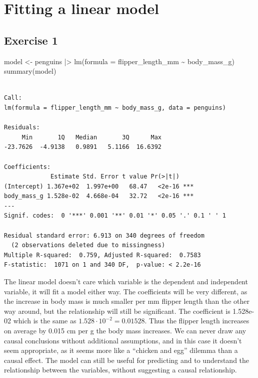 \documentclass[
  letterpaper,
  DIV=11,
  numbers=noendperiod]{scrreprt}
\newenvironment{Shaded}{\begin{snugshade}}{\end{snugshade}}
\newcommand{\AttributeTok}[1]{\textcolor[rgb]{0.40,0.45,0.13}{#1}}
\newcommand{\FunctionTok}[1]{\textcolor[rgb]{0.28,0.35,0.67}{#1}}
\newcommand{\NormalTok}[1]{\textcolor[rgb]{0.00,0.23,0.31}{#1}}
\newcommand{\OtherTok}[1]{\textcolor[rgb]{0.00,0.23,0.31}{#1}}
\newcommand{\SpecialCharTok}[1]{\textcolor[rgb]{0.37,0.37,0.37}{#1}}
\begin{document}
\section{Fitting a linear model}\label{fitting-a-linear-model-1}

\subsection{Exercise 1}\label{exercise-1-23}

\begin{Shaded}
\begin{Highlighting}[]
\NormalTok{model }\OtherTok{\textless{}{-}}\NormalTok{ penguins }\SpecialCharTok{|\textgreater{}} 
  \FunctionTok{lm}\NormalTok{(}\AttributeTok{formula =}\NormalTok{ flipper\_length\_mm }\SpecialCharTok{\textasciitilde{}}\NormalTok{ body\_mass\_g)}
\FunctionTok{summary}\NormalTok{(model)}
\end{Highlighting}
\end{Shaded}

\begin{verbatim}

Call:
lm(formula = flipper_length_mm ~ body_mass_g, data = penguins)

Residuals:
     Min       1Q   Median       3Q      Max 
-23.7626  -4.9138   0.9891   5.1166  16.6392 

Coefficients:
             Estimate Std. Error t value Pr(>|t|)    
(Intercept) 1.367e+02  1.997e+00   68.47   <2e-16 ***
body_mass_g 1.528e-02  4.668e-04   32.72   <2e-16 ***
---
Signif. codes:  0 '***' 0.001 '**' 0.01 '*' 0.05 '.' 0.1 ' ' 1

Residual standard error: 6.913 on 340 degrees of freedom
  (2 observations deleted due to missingness)
Multiple R-squared:  0.759, Adjusted R-squared:  0.7583 
F-statistic:  1071 on 1 and 340 DF,  p-value: < 2.2e-16
\end{verbatim}

The linear model doesn't care which variable is the dependent and
independent variable, it will fit a model either way. The coefficients
will be very different, as the increase in body mass is much smaller per
mm flipper length than the other way around, but the relationship will
still be significant. The coefficient is 1.528e-02 which is the same as
\(1.528 \cdot 10^{-2} = 0.01528\). Thus the flipper length increases on
average by 0.015 cm per g the body mass increases. We can never draw any
causal conclusions without additional assumptions, and in this case it
doesn't seem appropriate, as it seems more like a ``chicken and egg''
dilemma than a causal effect. The model can still be useful for
predicting and to understand the relationship between the variables,
without suggesting a causal relationship.
\end{document}
